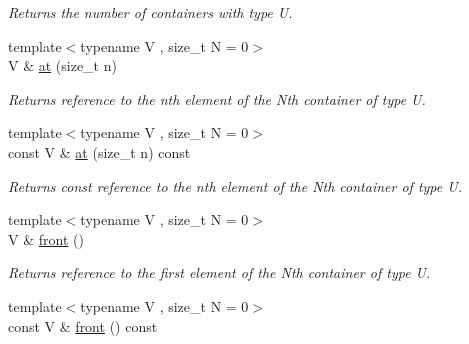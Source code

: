 \begin{DoxyCompactItemize}
\begin{DoxyCompactList}\small\item\em Returns the number of containers with type U. \end{DoxyCompactList}\item 
\hypertarget{classheterogeneous_1_1heterovector_3_01_t_01_4_aa4584b15035046a5aab796086b270686}{}{\footnotesize template$<$typename V , size\+\_\+t N = 0$>$ }\\V \& \hyperlink{classheterogeneous_1_1heterovector_3_01_t_01_4_aa4584b15035046a5aab796086b270686}{at} (size\+\_\+t n)\label{classheterogeneous_1_1heterovector_3_01_t_01_4_aa4584b15035046a5aab796086b270686}

\begin{DoxyCompactList}\small\item\em Returns reference to the nth element of the Nth container of type U. \end{DoxyCompactList}\item 
\hypertarget{classheterogeneous_1_1heterovector_3_01_t_01_4_addfa2f8d51d3992e1f945a5ecbc638a2}{}{\footnotesize template$<$typename V , size\+\_\+t N = 0$>$ }\\const V \& \hyperlink{classheterogeneous_1_1heterovector_3_01_t_01_4_addfa2f8d51d3992e1f945a5ecbc638a2}{at} (size\+\_\+t n) const \label{classheterogeneous_1_1heterovector_3_01_t_01_4_addfa2f8d51d3992e1f945a5ecbc638a2}

\begin{DoxyCompactList}\small\item\em Returns const reference to the nth element of the Nth container of type U. \end{DoxyCompactList}\item 
\hypertarget{classheterogeneous_1_1heterovector_3_01_t_01_4_ac431e099fe7b851b7e9897b054a11cc9}{}{\footnotesize template$<$typename V , size\+\_\+t N = 0$>$ }\\V \& \hyperlink{classheterogeneous_1_1heterovector_3_01_t_01_4_ac431e099fe7b851b7e9897b054a11cc9}{front} ()\label{classheterogeneous_1_1heterovector_3_01_t_01_4_ac431e099fe7b851b7e9897b054a11cc9}

\begin{DoxyCompactList}\small\item\em Returns reference to the first element of the Nth container of type U. \end{DoxyCompactList}\item 
\hypertarget{classheterogeneous_1_1heterovector_3_01_t_01_4_a640e13ee86804331b78634cd3ab71d9c}{}{\footnotesize template$<$typename V , size\+\_\+t N = 0$>$ }\\const V \& \hyperlink{classheterogeneous_1_1heterovector_3_01_t_01_4_a640e13ee86804331b78634cd3ab71d9c}{front} () const \label{classheterogeneous_1_1heterovector_3_01_t_01_4_a640e13ee86804331b78634cd3ab71d9c}


\end{DoxyCompactItemize}
